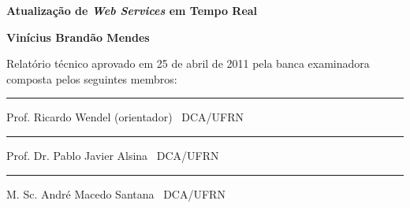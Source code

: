 %
%

\begin{titlepage}

\begin{center}

\LARGE

\textbf{Atualização de \textit{Web Services} em Tempo Real}

\vfill

\Large

\textbf{Vinícius Brandão Mendes}

\end{center}

\vfill

\noindent
Relatório técnico
aprovado em 25 de abril de 2011 pela banca examinadora composta
pelos seguintes membros:


\begin{center}

\vspace{1.5cm}\rule{0.95\linewidth}{1pt}
\parbox{0.9\linewidth}{%
Prof. Ricardo Wendel (orientador) \dotfill\ DCA/UFRN}

\vspace{1.5cm}\rule{0.95\linewidth}{1pt}
\parbox{0.9\linewidth}{%
Prof. Dr. Pablo Javier Alsina \dotfill\ DCA/UFRN}

\vspace{1.5cm}\rule{0.95\linewidth}{1pt}
\parbox{0.9\linewidth}{%
M. Sc. André Macedo Santana \dotfill\ DCA/UFRN}

\end{center}

\end{titlepage}

%
%


